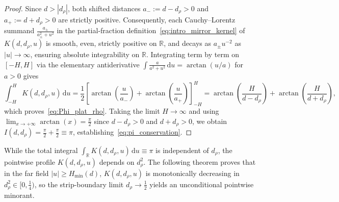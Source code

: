 \documentclass[11pt,reqno]{amsart}
\theoremstyle{definition}
\theoremstyle{remark}
\numberwithin{equation}{section}
\newcommand{\R}{\mathbb{R}}
\newcommand{\dd}{\mathrm{d}}
\begin{document}
\begin{proof}
Since $d > |d_\rho|$, both shifted distances $a_- := d - d_\rho > 0$ and $a_+ := d + d_\rho > 0$ are strictly positive. Consequently, each Cauchy--Lorentz summand $\frac{a_\pm}{a_\pm^2 + u^2}$ in the partial-fraction definition~\eqref{eq:intro_mirror_kernel} of $K(d, d_\rho, u)$ is smooth, even, strictly positive on $\R$, and decays as $a_\pm u^{-2}$ as $|u| \to \infty$, ensuring absolute integrability on $\R$. Integrating term by term on $[-H, H]$ via the elementary antiderivative $\int \frac{a}{a^2 + u^2}\,\dd u = \arctan(u/a)$ for $a > 0$ gives
\[
\int_{-H}^H K(d, d_\rho, u)\,\dd u = \frac{1}{2}\left[\arctan\!\left(\frac{u}{a_-}\right) + \arctan\!\left(\frac{u}{a_+}\right)\right]_{-H}^H = \arctan\!\left(\frac{H}{d - d_\rho}\right) + \arctan\!\left(\frac{H}{d + d_\rho}\right),
\]
which proves~\eqref{eq:Phi_plat_rho}. Taking the limit $H \to \infty$ and using $\lim_{x \to +\infty}\arctan(x) = \frac{\pi}{2}$ since $d - d_\rho > 0$ and $d + d_\rho > 0$, we obtain $I(d, d_\rho) = \frac{\pi}{2} + \frac{\pi}{2} \equiv \pi$, establishing~\eqref{eq:pi_conservation}.
\end{proof}

While the total integral $\int_{\R} K(d, d_\rho, u)\,\dd u \equiv \pi$ is independent of $d_\rho$, the pointwise profile $K(d, d_\rho, u)$ depends on $d_\rho^2$. The following theorem proves that in the far field $|u| \ge H_{\min}(d)$, $K(d, d_\rho, u)$ is monotonically decreasing in $d_\rho^2 \in [0, \frac{1}{4})$, so the strip-boundary limit $d_\rho \to \frac{1}{2}$ yields an unconditional pointwise minorant.
\end{document}
